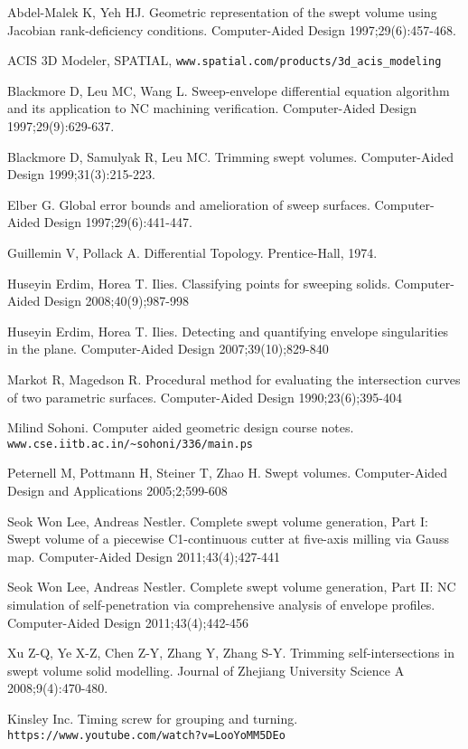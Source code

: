 \documentclass{elsart5p}
\begin{document}
\begin{thebibliography}{00}





Abdel-Malek K, Yeh HJ. Geometric representation of the swept volume using Jacobian rank-deficiency conditions. 
Computer-Aided Design 1997;29(6):457-468.

ACIS 3D Modeler, SPATIAL, 
\verb{www.spatial.com/products/3d_acis_modeling{

Blackmore D, Leu MC, Wang L. Sweep-envelope differential equation algorithm and its application to NC machining verification. 
Computer-Aided Design 1997;29(9):629-637.

Blackmore D, Samulyak R, Leu MC. Trimming swept volumes. 
Computer-Aided Design 1999;31(3):215-223.

Elber G. Global error bounds and amelioration of sweep surfaces.
Computer-Aided Design 1997;29(6):441-447.

Guillemin V, Pollack A. Differential Topology.
Prentice-Hall, 1974.

Huseyin Erdim, Horea T. Ilies. Classifying points for sweeping solids.
Computer-Aided Design 2008;40(9);987-998

Huseyin Erdim, Horea T. Ilies. Detecting and quantifying envelope singularities in the plane.
Computer-Aided Design 2007;39(10);829-840

Markot R, Magedson R. Procedural method for evaluating the intersection curves of two parametric surfaces.
Computer-Aided Design 1990;23(6);395-404

Milind Sohoni. Computer aided geometric design course notes.
\verb{www.cse.iitb.ac.in/~sohoni/336/main.ps{

Peternell M, Pottmann H, Steiner T, Zhao H. Swept volumes. 
Computer-Aided Design and Applications 2005;2;599-608

Seok Won Lee, Andreas Nestler. Complete swept volume generation, Part I: Swept volume of a piecewise C1-continuous cutter at five-axis milling via Gauss map.
Computer-Aided Design 2011;43(4);427-441

Seok Won Lee, Andreas Nestler. Complete swept volume generation, Part II: NC simulation of self-penetration via comprehensive analysis of envelope profiles.
Computer-Aided Design 2011;43(4);442-456

Xu Z-Q, Ye X-Z, Chen Z-Y, Zhang Y, Zhang S-Y. Trimming self-intersections in swept volume solid modelling. 
Journal of Zhejiang University Science A 2008;9(4):470-480.

Kinsley Inc. Timing screw for grouping and turning.
\verb{https://www.youtube.com/watch?v=LooYoMM5DEo{

\end{thebibliography}
\end{document}
